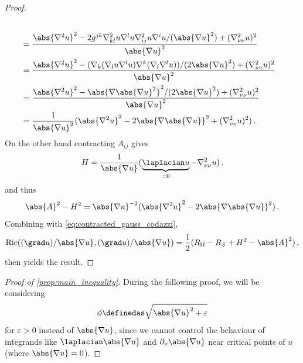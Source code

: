 \documentclass[titlepage,numbers=noenddot,oneside,%
cleardoublepage=empty,paper=a4,fontsize=11pt,%
english,%
]{scrartcl}
\newcommand*{\mathcomma}{\,,}
\newcommand*{\mathfullstop}{\,.}
\newcommand{\Ricci}{\mathrm{Ric}} %
\begin{document}
{\begin{proof}
\begin{equation*}
\begin{aligned}[t]
\begin{aligned}[t]
            \end{aligned}\\
            &=\frac{\abs{\nabla^2 u}^2-2g^{jk}\nabla^2_{kl}u\nabla^l u\nabla^2_{ij}u \nabla^i{u}/(\abs{\nabla u}^2)+(\nabla^2_{\nu\nu}u)^2}{\abs{\nabla u}^2}\\
            &=\frac{\abs{\nabla^2 u}^2-(\nabla_k(\nabla_l u \nabla^l u)\nabla^k(\nabla_l \nabla^l u))/(2\abs{\nabla u}^2) +(\nabla^2_{\nu\nu}u)^2}{\abs{\nabla u}^2}\\
            &=\frac{\abs{\nabla^2 u}^2-\abs{\nabla\abs{\nabla u}^2}^2/(2\abs{\nabla u}^2)+(\nabla^2_{\nu\nu}u)^2}{\abs{\nabla u}^2}\\
            &=\frac{1}{\abs{\nabla u}^2}(\abs{\nabla^2 u}^2-2\abs{\nabla \abs{\nabla u}}^2+(\nabla^2_{\nu\nu}u)^2)\mathfullstop
        \end{aligned}
    \end{equation*}
    On the other hand contracting \( A_{ij} \) gives
    \begin{equation*}
        H=\frac{1}{\abs{\nabla u}}(\underbrace{\laplacian u}_{=0}-\nabla^2_{\nu \nu} u)\mathfullstop
    \end{equation*}
    and thus
    \begin{equation*}
        \abs{A}^2-H^2=\abs{\nabla u}^{-2}(\abs{\nabla^2 u}^2-2\abs{\nabla\abs{\nabla u}}^2)\mathfullstop
    \end{equation*}
    Combining with \cref{eq:contracted_gauss_codazzi},
    \begin{equation*}
        \Ricci((\grad u)/\abs{\nabla u},(\grad u)/\abs{\nabla u})=\frac{1}{2}(R_\Omega-R_S+H^2-\abs{A}^2)\mathcomma
    \end{equation*} 
    then yields the result.
\end{proof}
\begin{proof}[Proof of \cref{prop:main_inequality}]
    During the following proof, we will be considering 
    \begin{equation*}
        \phi\definedas \sqrt{\abs{\nabla u}^2+\varepsilon} 
    \end{equation*}
    for \( \varepsilon>0 \) instead of \( \abs{\nabla u} \), since we cannot control the behaviour of integrands like \( \laplacian \abs{\nabla u} \) and \( \partial_\nu \abs{\nabla u} \) near critical points of \( u \) (where \( \abs{\nabla u}=0 \)).


\end{proof}}
\end{document}
